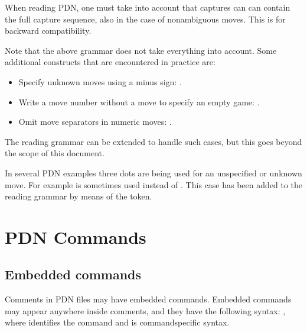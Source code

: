 \documentclass[letterpaper,10pt,english]{sphinxmanual}
\begin{document}
\sphinxAtStartPar
When reading PDN, one must take into account that captures can can contain the full capture sequence,
also in the case of non\sphinxhyphen{}ambiguous moves. This is for backward compatibility.

\sphinxAtStartPar
Note that the above  grammar does not take everything into account. Some additional
constructs that are encountered in practice are:
\begin{itemize}
\item {} 
\sphinxAtStartPar
Specify unknown moves using a minus sign: .

\item {} 
\sphinxAtStartPar
Write a move number without a move to specify an empty game: .

\item {} 
\sphinxAtStartPar
Omit move separators in numeric moves: .

\end{itemize}

\sphinxAtStartPar
The reading grammar can be extended to handle such cases, but this goes beyond the
scope of this document.

\sphinxAtStartPar
In several PDN examples three dots are being used for an unspecified or unknown move.
For example  is sometimes used instead of . This case has
been added to the reading grammar by means of the  token.

\sphinxstepscope


\chapter{PDN Commands}
\label{\detokenize{commands:pdn-commands}}\label{\detokenize{commands:commands-section}}\label{\detokenize{commands::doc}}

\section{Embedded commands}
\label{\detokenize{commands:embedded-commands}}
\sphinxAtStartPar
Comments in PDN files may have embedded commands. Embedded
commands may appear anywhere inside comments, and they have the
following syntax: , where  identifies
the command and  is command\sphinxhyphen{}specific syntax.
\end{document}
